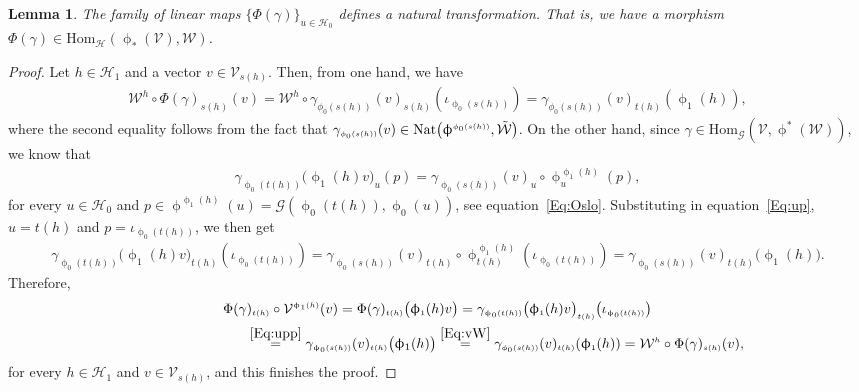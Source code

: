 \documentclass[pdftex]{sigma}
\numberwithin{equation}{section}
\newtheorem{Lemma}[Theorem]{Lemma}
\renewcommand{\hom}[3]{\mathrm{Hom}_{\Sscript{#1}}\left(#2, #3\right)}
\newcommand{\Ho}{\cH_{\Sscript{0}}}
\newcommand{\Ha}{\cH_{\Sscript{1}}}
\newcommand{\cG}{{\mathcal G}}
\newcommand{\cH}{{\mathcal H}}
\newcommand{\cV}{{\mathcal V}}
\newcommand{\cW}{{\mathcal W}}
\newcommand{\Sscript}[1]{\scriptscriptstyle{#1}}
\newcommand{\phia}{\upphi_{\Sscript{1}}}
\begin{document}
\begin{Lemma}\label{lema:Phi}The family of linear maps $\{ \Phi(\gamma)\}_{\Sscript{u \in \Ho}}$ defines a natural transformation. That is, we have a morphism $\Phi(\gamma) \in \hom{\cH}{\upphi_{*}(\cV)}{\cW}$.
\end{Lemma}
\begin{proof}Let $h \in \Ha$ and a vector $v \in \cV_{\Sscript{s(h)}}$. Then, from one hand, we have
\begin{gather}\label{Eq:vW}
\cW^{\Sscript{h}} \circ \Phi(\gamma)_{\Sscript{s(h)}}(v) = \cW^{\Sscript{h}} \circ \gamma_{\Sscript{\phi_0(s(h))}}(v)_{\Sscript{s(h)}}(\iota_{\Sscript{\upphi_{0}(s(h))}}) =\gamma_{\Sscript{\phi_0(s(h))}}(v)_{
\Sscript{t(h)}}(\upphi_{\Sscript{1}}(h)),
\end{gather}
where the second equality follows from the fact that $\gamma_{\Sscript{\phi_0(s(h))}}(v) \in {\rm Nat}\big(\upphi^{\Sscript{\phi_0(s(h))}}, \tilde{\cW}\big)$. On the other hand, since $\gamma \in \hom{\cG}{\cV}{\upphi^*(\cW)}$, we know that
\begin{gather}\label{Eq:up}
\gamma_{\Sscript{\upphi_0(t(h))}}\big( \upphi_{\Sscript{1}}(h) v \big)_{\Sscript{u}} (p) = \gamma_{\Sscript{\upphi_0(s(h))}}( v)_{\Sscript{u}} \circ \upphi^{\Sscript{\upphi_1(h)}}_{\Sscript{u}}(p),
\end{gather}
for every $u \in \Ho$ and $p \in \upphi^{\Sscript{\upphi_1(h)}} (u)=\cG( \upphi_{\Sscript{0}}(t(h)),\upphi_{\Sscript{0}}(u) )$, see equation~\eqref{Eq:Oslo}. Substituting in equation~\eqref{Eq:up}, $u= t(h)$ and $p = \iota_{\Sscript{\upphi_0(t(h))}}$, we then get
\begin{gather}\label{Eq:upp}
\gamma_{\Sscript{\upphi_0(t(h))}}\big( \upphi_{\Sscript{1}}(h) v
\big)_{\Sscript{t(h)}} (\iota_{\Sscript{\upphi_0(t(h))}}) =
\gamma_{\Sscript{\upphi_0(s(h))}}(v)_{\Sscript{t(h)}}
\circ \upphi^{\Sscript{\upphi_1(h)}}_{\Sscript{t(h)}}(\iota_{\Sscript{\upphi_0(t(h))}})
= \gamma_{\Sscript{\upphi_0(s(h))}}(v)_{\Sscript{t(h)}}
\big( \upphi_1(h) \big).
\end{gather}
Therefore,
\begin{gather*}
\Phi(\gamma)_{\Sscript{t(h)}}\circ \cV^{\Sscript{\phia(h)}} (v) = \Phi(\gamma)_{\Sscript{t(h)}}\big( \phia(h) v \big) = \gamma_{\Sscript{\upphi_0(t(h))}}\big( \phia(h) v\big)_{\Sscript{t(h)}}\big(\iota_{\Sscript{\upphi_0(t(h))}} \big)\\
\hphantom{\Phi(\gamma)_{\Sscript{t(h)}}\circ \cV^{\Sscript{\phia(h)}} (v)}{}\overset{\eqref{Eq:upp}}{=} \gamma_{\Sscript{\upphi_0(s(h))}}(v)_{\Sscript{t(h)}}
\big( \upphi_1(h) \big) \overset{\eqref{Eq:vW}}{=} \gamma_{\Sscript{\phi_0(s(h))}}(v)_{ \Sscript{t(h)}}(\upphi_{\Sscript{1}}(h)) = \cW^{\Sscript{h}} \circ \Phi(\gamma)_{\Sscript{s(h)}}(v),
\end{gather*}
for every $h \in \Ha$ and $v \in \cV_{\Sscript{s(h)}}$, and this finishes the proof.
\end{proof}
\end{document}
